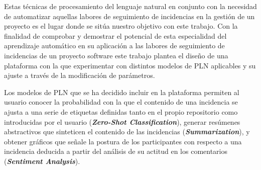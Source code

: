 Estas técnicas de procesamiento del lenguaje natural en conjunto con la necesidad de automatizar aquellas labores de seguimiento de incidencias en la gestión de un proyecto es el lugar donde se sitúa nuestro objetivo con este trabajo. Con la finalidad de comprobar y demostrar el potencial de esta especialidad del aprendizaje automático en su aplicación a las labores de seguimiento de incidencias de un proyecto software este trabajo plantea el diseño de una plataforma con la que experimentar con distintos modelos de PLN aplicables y su ajuste a través de la modificación de parámetros.  

Los modelos de PLN que se ha decidido incluir en la plataforma permiten al usuario conocer la probabilidad con la que el contenido de una incidencia se ajusta a una serie de etiquetas definidas tanto en el propio repositorio como introducidas por el usuario (\textbf{\emph{Zero-Shot Classification}}), generar resúmenes abstractivos que sinteticen el contenido de las incidencias (\textbf{\emph{Summarization}}), y obtener gráficos que señale la postura de los participantes con respecto a una incidencia deducida a partir del análisis de su actitud en los comentarios (\textbf{\emph{Sentiment Analysis}}).
